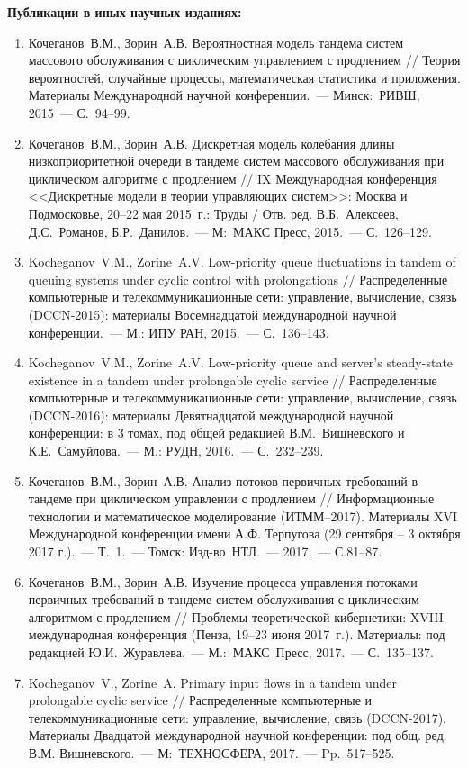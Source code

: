 \textbf{Публикации в иных научных изданиях:}

\begin{enumerate}[resume]
  \item Кочеганов~В.М., Зорин~А.В. Вероятностная модель тандема систем массового обслуживания с циклическим управлением с продлением // Теория вероятностей, случайные процессы, математическая статистика и приложения. Материалы Международной научной конференции.~--- Минск:~РИВШ, 2015~--- С.~94--99.
\item Кочеганов~В.М., Зорин~А.В. Дискретная модель колебания длины низкоприоритетной очереди в тандеме систем массового обслуживания при циклическом алгоритме с продлением // IX Международная конференция <<Дискретные модели в теории управляющих систем>>: Москва и Подмосковье, 20--22 мая 2015~г.: Труды / Отв. ред. В.Б.~Алексеев, Д.С.~Романов, Б.Р.~Данилов.~--- М:~МАКС Пресс, 2015.~--- С.~126--129.
\item Kocheganov~V.M., Zorine~A.V. Low-priority queue fluctuations in tandem of queuing systems under cyclic control with prolongations // Распределенные компьютерные и телекоммуникационные сети: управление, вычисление, связь (DCCN-2015): материалы Восемнадцатой международной научной конференции.~--- М.: ИПУ РАН, 2015.~--- С.~136--143.
\item Kocheganov~V.M., Zorine~A.V. Low-priority queue and server’s steady-state existence in a tandem under prolongable cyclic service // Распределенные компьютерные и телекоммуникационные сети: управление, вычисление, связь (DCCN-2016): материалы Девятнадцатой международной научной конференции: в 3 томах, под общей редакцией В.М.~Вишневского и К.Е.~Самуйлова.~--- М.: РУДН, 2016.~--- С.~232--239.
\item Кочеганов~В.М., Зорин~А.В. Анализ потоков первичных требований в тандеме при циклическом управлении с продлением // Информационные технологии и математическое моделирование (ИТММ--2017). Материалы XVI Международной конференции имени А.Ф. Терпугова (29 сентября -- 3 октября 2017 г.).~--- Т.~1.~--- Томск: Изд-во~НТЛ.~--- 2017.~--- С.81--87.
\item Кочеганов~В.М., Зорин~А.В. Изучение процесса управления потоками первичных требований в тандеме систем обслуживания с циклическим алгоритмом с продлением // Проблемы теоретической кибернетики: XVIII международная конференция (Пенза, 19--23 июня 2017~г.). Материалы: под редакцией Ю.И.~Журавлева.~--- М.:~МАКС~Пресс, 2017.~--- С.~135--137.
\item Kocheganov~V., Zorine~A. Primary input flows in a tandem under prolongable cyclic service // Распределенные компьютерные и телекоммуникационные сети: управление, вычисление, связь (DCCN-2017). Материалы Двадцатой международной научной конференции: под общ. ред. В.М. Вишневского.~--- М:~ТЕХНОСФЕРА, 2017.~--- Pp.~517--525.

\end{enumerate}
